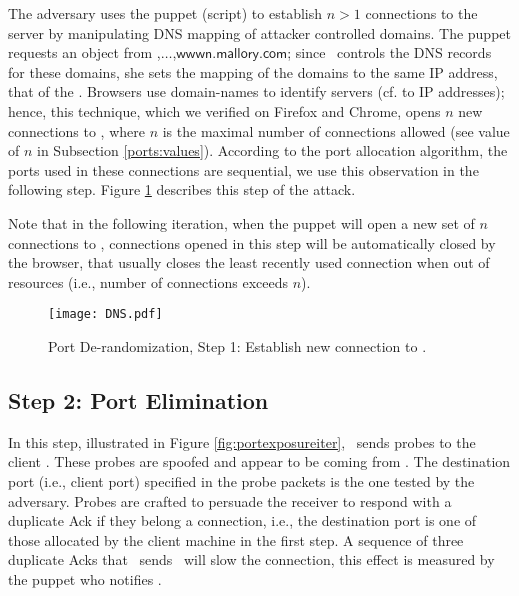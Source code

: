 \documentclass[conference]{IEEEtran}
\newcommand{\malcomn}{\mbox{$\mathsf{wwwn.mallory.com}$}}
\begin{document}
The adversary uses the puppet (script) to establish $n > 1$ connections to the server by manipulating DNS mapping of attacker controlled domains. The puppet requests an object from \malcoma,$\dots$,\malcomn; since \mal\ controls the DNS records for these domains, she sets the mapping of the domains to the same IP address, that of the \lin. Browsers use domain-names to identify servers (cf. to IP addresses); hence, this technique, which we verified on Firefox and Chrome, opens $n$ new connections to \lin, where $n$ is the maximal number of connections allowed (see value of $n$ in Subsection \ref{ports:values}). According to the port allocation algorithm, the ports used in these connections are sequential, we use this observation in the following step. Figure \ref{fig:openconn} describes this step of the attack.

Note that in the following iteration, when the puppet will open a new set of $n$ connections to \lin, connections opened in this step will be automatically closed by the browser, that usually closes the least recently used connection when out of resources (i.e., number of connections exceeds $n$).


\begin{figure}
  \begin{center}
    \texttt{[image: DNS.pdf]}
  \end{center}
  \caption{Port De-randomization, Step 1: Establish new connection to \lin.}
    \label{fig:openconn}
\end{figure}



\subsection{Step 2: Port Elimination}

In this step, illustrated in Figure \ref{fig:portexposureiter}, \mal\ sends probes to the client \wini. These probes are spoofed and appear to be coming from \lin. The destination port (i.e., client port) specified in the probe packets is the one tested by the adversary. Probes are crafted to persuade the receiver to respond with a duplicate Ack if they belong a connection, i.e., the destination port is one of those allocated by the client machine in the first step. A sequence of three duplicate Acks that \wini\ sends \lin\ will slow the connection, this effect is measured by the puppet who notifies \mal.
\end{document}
